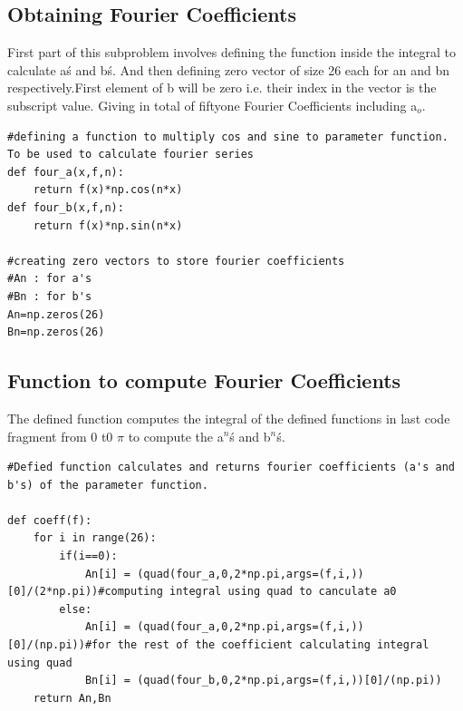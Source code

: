 \documentclass[a4paper]{article}
\begin{document}
\subsection{Obtaining Fourier Coefficients}
First part of this subproblem involves defining the function inside the integral to calculate a\'s and b\'s. And then defining zero vector of size 26 each for an and bn respectively.First element of b will be zero i.e. their index in the vector is the subscript value. Giving in total of fifty\-one  Fourier Coefficients including a$_{o}$. 

\begin{lstlisting}
#defining a function to multiply cos and sine to parameter function. To be used to calculate fourier series
def four_a(x,f,n):
	return f(x)*np.cos(n*x)
def four_b(x,f,n):
	return f(x)*np.sin(n*x)

#creating zero vectors to store fourier coefficients
#An : for a's
#Bn : for b's
An=np.zeros(26)
Bn=np.zeros(26)

\end{lstlisting}
\subsection{Function to compute Fourier Coefficients}
The defined function computes the integral of the defined functions in last code fragment from 0 t0 $\pi$ to compute the a$^{n}$\'s and b$^{n}$\'s.
\begin{lstlisting}
#Defied function calculates and returns fourier coefficients (a's and b's) of the parameter function.

def coeff(f):
	for i in range(26):
		if(i==0):
			An[i] = (quad(four_a,0,2*np.pi,args=(f,i,))[0]/(2*np.pi))#computing integral using quad to canculate a0
		else:
			An[i] = (quad(four_a,0,2*np.pi,args=(f,i,))[0]/(np.pi))#for the rest of the coefficient calculating integral using quad
			Bn[i] = (quad(four_b,0,2*np.pi,args=(f,i,))[0]/(np.pi))
	return An,Bn

\end{lstlisting}
\end{document}
